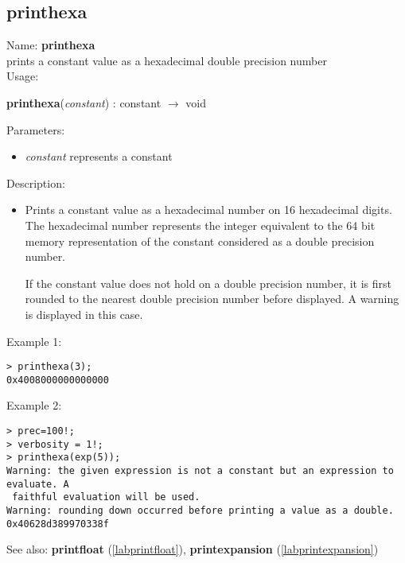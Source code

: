 \subsection{printhexa}
\label{labprinthexa}
\noindent Name: \textbf{printhexa}\\
prints a constant value as a hexadecimal double precision number\\

\noindent Usage: 
\begin{center}
\textbf{printhexa}(\emph{constant}) : \textsf{constant} $\rightarrow$ \textsf{void}\\
\end{center}
Parameters: 
\begin{itemize}
\item \emph{constant} represents a constant
\end{itemize}
\noindent Description: \begin{itemize}

\item Prints a constant value as a hexadecimal number on 16 hexadecimal
   digits. The hexadecimal number represents the integer equivalent to
   the 64 bit memory representation of the constant considered as a
   double precision number.
    
   If the constant value does not hold on a double precision number, it
   is first rounded to the nearest double precision number before
   displayed. A warning is displayed in this case.
\end{itemize}
\noindent Example 1: 
\begin{center}\begin{minipage}{15cm}\begin{Verbatim}[frame=single]
> printhexa(3);
0x4008000000000000
\end{Verbatim}
\end{minipage}\end{center}
\noindent Example 2: 
\begin{center}\begin{minipage}{15cm}\begin{Verbatim}[frame=single]
> prec=100!;
> verbosity = 1!;
> printhexa(exp(5));
Warning: the given expression is not a constant but an expression to evaluate. A
 faithful evaluation will be used.
Warning: rounding down occurred before printing a value as a double.
0x40628d389970338f
\end{Verbatim}
\end{minipage}\end{center}
See also: \textbf{printfloat} (\ref{labprintfloat}), \textbf{printexpansion} (\ref{labprintexpansion})
